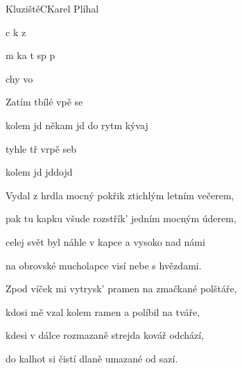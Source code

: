 \setcounter{page}{42}
\begin{song}{Kluziště}{C}{Karel Plíhal}

\begin{SBVerse}

  c k  z 

    m ka t sp p

   chy vo

     

\end{SBVerse}

\begin{SBChorus}

   Zatím tbílé vpě se

   kolem jd někam jd do rytm kývaj

   tyhle tř vrpě seb

   kolem jd jddojd

  \end{SBChorus}

\begin{SBVerse}

   Vydal z hrdla mocný pokřik ztichlým letním večerem,

   pak tu kapku všude rozstřík' jedním mocným úderem,

   celej svět byl náhle v kapce a vysoko nad námi

   na obrovské mucholapce visí nebe s hvězdami.

\end{SBVerse}

\begin{SBVerse}

   Zpod víček mi vytrysk' pramen na zmačkané polštáře,

   kdosi mě vzal kolem ramen a políbil na tváře,

   kdesi v dálce rozmazaně strejda kovář odchází,

   do kalhot si čistí dlaně umazané od sazí.

 \end{SBVerse}

 \end{song} 

\pagebreak

